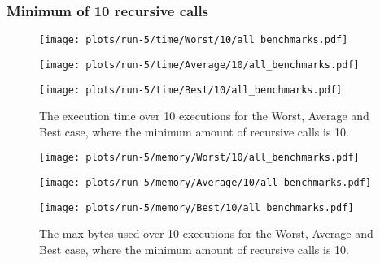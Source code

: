 \subsubsection{Minimum of 10 recursive calls}
\begin{figure}[H]
  \begin{minipage}{.5\textwidth}
    \centering
    \texttt{[image: plots/run-5/time/Worst/10/all\_benchmarks.pdf]}  
  \end{minipage}
  \begin{minipage}{.5\textwidth}
    \centering
    \texttt{[image: plots/run-5/time/Average/10/all\_benchmarks.pdf]}  
  \end{minipage}
  \begin{center}
    \begin{minipage}[c]{.5\textwidth}
      \centering
      \texttt{[image: plots/run-5/time/Best/10/all\_benchmarks.pdf]}  
    \end{minipage}
  \end{center}
  \caption{The execution time over 10 executions for the Worst, Average and Best case, where the minimum amount of recursive calls is 10.}
\end{figure}
\begin{figure}[H]
  \begin{minipage}{.5\textwidth}
    \centering
    \texttt{[image: plots/run-5/memory/Worst/10/all\_benchmarks.pdf]}  
  \end{minipage}
  \begin{minipage}{.5\textwidth}
    \centering
    \texttt{[image: plots/run-5/memory/Average/10/all\_benchmarks.pdf]}  
  \end{minipage}
  \begin{center}
    \begin{minipage}[c]{.5\textwidth}
      \centering
      \texttt{[image: plots/run-5/memory/Best/10/all\_benchmarks.pdf]}  
    \end{minipage}
  \end{center}
  \caption{The max-bytes-used over 10 executions for the Worst, Average and Best case, where the minimum amount of recursive calls is 10.}
\end{figure}